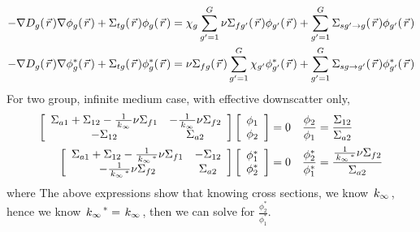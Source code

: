 \documentclass{school-22.211-notes}
\begin{document}
\begin{align}
 -\nabla D_g (\left.\vec{r}\right.) \nabla \phi_g(\left.\vec{r}\right.) + \Sigma_{tg} (\left.\vec{r}\right.) \phi_g(\left.\vec{r}\right.) &= \chi_g \displaystyle\sum_{g'=1}^G \nu \Sigma_{fg'} (\left.\vec{r}\right.) \phi_{g'}(\left.\vec{r}\right.) + \displaystyle\sum_{g'=1}^G \Sigma_{sg'\to g} (\left.\vec{r}\right.) \phi_{g'}(\left.\vec{r}\right.) \\
 -\nabla D_g (\left.\vec{r}\right.) \nabla \phi_g^* (\left.\vec{r}\right.) + \Sigma_{tg} (\left.\vec{r}\right.) \phi_g^* (\left.\vec{r}\right.) &= \nu \Sigma_{fg} (\left.\vec{r}\right.)\displaystyle\sum_{g'=1}^G \chi_{g'} \phi_{g'}^* (\left.\vec{r}\right.) + \displaystyle\sum_{g'=1}^G \Sigma_{sg\to g'} (\left.\vec{r}\right.) \phi_{g'}^*(\left.\vec{r}\right.)
\end{align}
For two group, infinite medium case, with effective downscatter only, 
\begin{align}
\left[ \begin{array}{cc}
\Sigma_{a1} + \Sigma_{12} - \frac{1}{\left. k_{\infty} \right.} \nu \Sigma_{f1} & - \frac{1}{\left. k_{\infty} \right.} \nu \Sigma_{f2} \\
- \Sigma_{12} & \Sigma_{a2} \end{array} \right] 
\left[ \begin{array}{c}
\phi_1 \\ \phi_2 \end{array} \right] &= 0  
&\frac{\phi_2}{\phi_1} &= \frac{\Sigma_{12}}{\Sigma_{a2}}   \\
\left[ \begin{array}{cc}
\Sigma_{a1} + \Sigma_{12} - \frac{1}{\left. k_{\infty} \right.^*} \nu \Sigma_{f1} & - \Sigma_{12} \\
- \frac{1}{\left. k_{\infty} \right.^*} \nu \Sigma_{f2} & \Sigma_{a2} \end{array} \right] 
\left[ \begin{array}{c}
\phi_1^* \\ \phi_2^* \end{array} \right] &= 0  
&\frac{\phi_2^*}{\phi_1^*} &= \frac{\frac{1}{\left. k_{\infty} \right.^*} \nu \Sigma_{f2}}{\Sigma_{a2}}  
\end{align}
where 
The above expressions show that knowing cross sections, we know $\left. k_{\infty} \right.$, hence we know $\left. k_{\infty} \right.^* = \left. k_{\infty} \right.$, then we can solve for $\frac{\phi_2^*}{\phi_1^*}$. 
\end{document}
